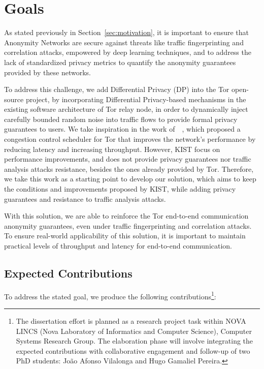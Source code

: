 \section{Goals}\label{sec:goals}

As stated previously in Section~\ref{sec:motivation}, it is important to ensure that Anonymity Networks are secure against threats like traffic fingerprinting and correlation attacks, empowered by deep learning techniques, and to address the lack of standardized privacy metrics to quantify the anonymity guarantees provided by these networks.

To address this challenge, we add Differential Privacy (DP) into the Tor open-source project, by incorporating Differential Privacy-based mechanisms in the existing software architecture of Tor relay node, in order to dynamically inject carefully bounded random noise into traffic flows to provide formal privacy guarantees to users. 
We take inspiration in the work of~\citeauthor{KIST}~\cite{KIST}, which proposed a congestion control scheduler for Tor that improves the network's performance by reducing latency and increasing throughput. However, KIST focus on performance improvements, and does not provide privacy guarantees nor traffic analysis attacks resistance, besides the ones already provided by Tor. Therefore, we take this work as a starting point to develop our solution, which aims to keep the conditions and improvements proposed by KIST, while adding privacy guarantees and resistance to traffic analysis attacks.

With this solution, we are able to reinforce the Tor end-to-end communication anonymity guarantees, even under traffic fingerprinting and correlation attacks. To ensure real-world applicability of this solution, it is important to maintain practical levels of throughput and latency for end-to-end communication. 

\subsection{Expected Contributions}\label{sub:contributions}

To address the stated goal, we produce the following contributions\footnote{The dissertation effort is planned as a research project task within NOVA LINCS (Nova Laboratory of Informatics and Computer Science), Computer Systems Research Group. The elaboration phase will involve integrating the expected contributions with collaborative engagement and follow-up of two PhD students: João Afonso Vilalonga and Hugo Gamaliel Pereira.}:

